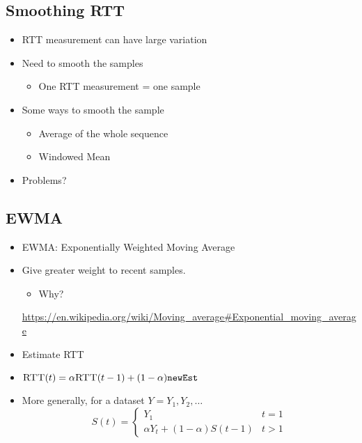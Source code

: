 \subsection{Smoothing RTT}
\begin{itemize}[nosep]
    \item RTT measurement can have large variation
    \item Need to smooth the samples
          \begin{itemize}[nosep]
              \item One RTT measurement = one sample
          \end{itemize}
    \item Some ways to smooth the sample
          \begin{itemize}[nosep]
              \item Average of the whole sequence
              \item Windowed Mean
          \end{itemize}
    \item Problems?
\end{itemize}

\subsection{EWMA}
\begin{itemize}[nosep]
    \item EWMA: Exponentially Weighted Moving Average
    \item Give greater weight to recent samples.
          \begin{itemize}[nosep]
              \item Why?
          \end{itemize}
          \url{https://en.wikipedia.org/wiki/Moving_average#Exponential_moving_average}
    \item Estimate RTT
    \item $\textproc{RTT}(t) = \alpha \textproc{RTT}(t - 1) + (1 - \alpha) \texttt{newEst}$
    \item More generally, for a dataset $Y = Y_1, Y_2, \dots$
          \[S(t) = \begin{cases}Y_1 & t = 1\\\alpha Y_t + (1 - \alpha)S(t - 1) & t > 1\end{cases}\]
\end{itemize}